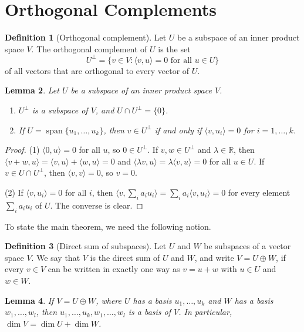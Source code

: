 \documentclass[11pt]{article}
\newcommand{\ip}[2]{\langle #1, #2 \rangle}
\theoremstyle{definition}
\newtheorem{definition}{Definition}[section]
\theoremstyle{plain}
\newtheorem{lemma}[definition]{Lemma}
\theoremstyle{remark}
\DeclareMathOperator{\Span}{span}
\begin{document}
\section{Orthogonal Complements}

\begin{definition}[Orthogonal complement]
    Let $U$ be a subspace of an inner product space $V$. The orthogonal complement of $U$ is the set
    \[U^\perp = \{v \in V : \ip{v}{u} = 0 \text{ for all } u \in U\}\]
    of all vectors that are orthogonal to every vector of $U$.
\end{definition}

\begin{lemma}\label{lem:complement}
    Let $U$ be a subspace of an inner product space $V$.
    \begin{enumerate}
        \item $U^\perp$ is a subspace of $V$, and $U \cap U^\perp = \{0\}$.
        \item If $U = \Span\{u_1, \ldots, u_k\}$, then $v \in U^\perp$ if and only if $\ip{v}{u_i} = 0$ for $i = 1, \ldots, k$.
    \end{enumerate}
\end{lemma}

\begin{proof}
    (1) $\ip{0}{u} = 0$ for all $u$, so $0 \in U^\perp$. If $v, w \in U^\perp$ and $\lambda \in \mathbb{R}$, then $\ip{v + w}{u} = \ip{v}{u} + \ip{w}{u} = 0$ and $\ip{\lambda v}{u} = \lambda \ip{v}{u} = 0$ for all $u \in U$. If $v \in U \cap U^\perp$, then $\ip{v}{v} = 0$, so $v = 0$.

    (2) If $\ip{v}{u_i} = 0$ for all $i$, then $\ip{v}{\sum_i a_i u_i} = \sum_i a_i \ip{v}{u_i} = 0$ for every element $\sum_i a_i u_i$ of $U$. The converse is clear.
\end{proof}

To state the main theorem, we need the following notion.

\begin{definition}[Direct sum of subspaces]
    Let $U$ and $W$ be subspaces of a vector space $V$. We say that $V$ is the direct sum of $U$ and $W$, and write $V = U \oplus W$, if every $v \in V$ can be written in exactly one way as $v = u + w$ with $u \in U$ and $w \in W$.
\end{definition}

\begin{lemma}\label{lem:direct-sum-dim}
    If $V = U \oplus W$, where $U$ has a basis $u_1, \ldots, u_k$ and $W$ has a basis $w_1, \ldots, w_l$, then $u_1, \ldots, u_k, w_1, \ldots, w_l$ is a basis of $V$. In particular, $\dim V = \dim U + \dim W$.
\end{lemma}
\end{document}
